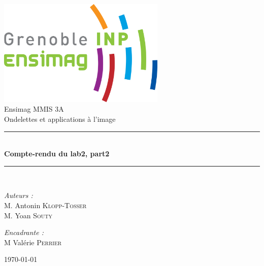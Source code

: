 \documentclass[a4paper,12pt, openany, twoside]{article}
\theoremstyle{break}
\begin{document}

\begin{titlepage}
\begin{center}

\includegraphics[width=0.6\textwidth]{ensimag_logo.png}\\[1cm]

{\large Ensimag MMIS 3A}\\[0.5cm]

{\large Ondelettes et applications à l'image}\\[0.5cm]

\rule{\linewidth}{0.5mm} \\[0.4cm]
{ \huge \bfseries Compte-rendu du lab2, part2\\[0.4cm] }
\rule{\linewidth}{0.5mm} \\[1.5cm]

\noindent
\begin{minipage}{0.4\textwidth}
  \begin{flushleft} \large
    \emph{Auteurs :}\\
    M. Antonin \textsc{Klopp-Tosser}\\
    M. Yoan \textsc{Souty} \\
  \end{flushleft}
\end{minipage}%
\begin{minipage}{0.4\textwidth}
  \begin{flushright} \large
    \emph{Encadrante :} \\
    M Valérie \textsc{Perrier} \\

  \end{flushright}
\end{minipage}

\vfill

{\large \today}

\end{center}
\end{titlepage}
\end{document}
